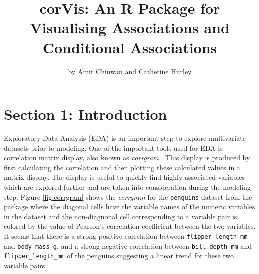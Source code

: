 \title{corVis: An R Package for Visualising Associations and Conditional
Associations}
\author{by Amit Chinwan and Catherine Hurley}

\maketitle


\hypertarget{section-1-introduction}{%
\section{Section 1: Introduction}\label{section-1-introduction}}

Exploratory Data Analysis (EDA) is an important step to explore
multivariate datasets prior to modeling. One of the important tools used
for EDA is correlation matrix display, also known as \emph{corrgram}
\citep{friendly2002corrgrams}. This display is produced by first
calculating the correlation and then plotting these calculated values in
a matrix display. The display is useful to quickly find highly
associated variables which are explored further and are taken into
consideration during the modeling step. Figure \ref{fig:corrgram} shows
the \emph{corrgram} for the \texttt{penguins} dataset from the
 package where the diagonal cells have the
variable names of the numeric variables in the dataset and the
non-diagnonal cell corresponding to a variable pair is colored by the
value of Pearson's correlation coefficient between the two variables. It
seems that there is a strong positive correlation between
\texttt{flipper\_length\_mm} and \texttt{body\_mass\_g}, and a strong
negative correlation between \texttt{bill\_depth\_mm} and
\texttt{flipper\_length\_mm} of the penguins suggesting a linear trend
for these two variable pairs.

